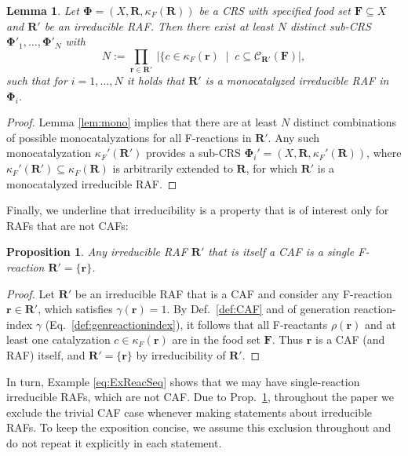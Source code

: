 \documentclass[pdflatex]{sn-jnl}
\theoremstyle{thmstyleone}%
\newtheorem{proposition}[theorem]{Proposition}%
\newtheorem{lemma}[theorem]{Lemma}%
\theoremstyle{examplesty}%
\theoremstyle{thmstylethree}%
\newcommand{\food}{\ensuremath{\mathbf{F}}}
\newcommand{\closure}[2]{\mathscr{C}_{#1}(#2)}
\newcommand{\FR}[0]{\mathbf{R}}
\newcommand{\fr}[0]{\mathbf{r}}
\newcommand{\RAF}[0]{\mathbf{R}'}
\newcommand{\cat}{\kappa_F}
\begin{document}
\vspace{6pt}
\begin{lemma}\label{lem:ExpoSubCRS}
  Let $\mathbf{\Phi}=(X,\FR,\cat(\FR))$ be a CRS with specified \emph{food
    set} $\food\subseteq X$ and $\RAF$ be an irreducible RAF. Then there
  exist at least $N$ distinct sub-CRS
  $\mathbf{\Phi}'_1,\ldots, \mathbf{\Phi}'_N$ with
  \begin{equation} \label{eq:ExpoNum} N := \prod_{\fr\in \RAF}\ \vert \{ c
    \in\cat(\fr) \; \mid\; c \subseteq \closure{\RAF}{\food} \vert,
  \end{equation}
  such that for $i=1,\ldots,N$ it holds that $\RAF$ is a monocatalyzed
  irreducible RAF in $\mathbf{\Phi}_i$.
\end{lemma} 
\begin{proof}
  Lemma \ref{lem:mono} implies that there are at least
  $N$ distinct combinations of
  possible monocatalyzations for all F-reactions in $\RAF$. Any such
  monocatalyzation $\cat'(\RAF)$ provides a sub-CRS
  $\mathbf{\Phi}_i'=(X,\FR,\cat'(\FR))$, where
  $\cat'(\RAF)\subseteq\cat(\FR)$ is arbitrarily extended to $\FR$, for
  which $\RAF$ is a monocatalyzed irreducible RAF.
\end{proof}

Finally, we underline that irreducibility is a property that is of interest
only for RAFs that are not CAFs: \vspace{6pt}
\begin{proposition}\label{prop:Caftrivial}
  Any irreducible RAF $\RAF$ that is itself a CAF is a single F-reaction
  $\RAF=\{\fr\}$.
\end{proposition}
\begin{proof}
  Let $\RAF$ be an irreducible RAF that is a CAF and consider any
  F-reaction $\fr\in \RAF$, which satisfies $\gamma(\fr)=1$. By
  Def.~\ref{def:CAF} and of generation reaction-index $\gamma$
  (Eq.~\eqref{def:genreactionindex}), it follows that all F-reactants
  $\rho(\fr)$ and at least one catalyzation $c\in \cat(\fr)$ are in the
  food set $\food$. Thus $\fr$ is a CAF (and RAF) itself, and
  $\RAF=\{\fr\}$ by irreducibility of $\RAF$.
\end{proof}

In turn, Example \eqref{eq:ExReacSeq} shows that we may have
single-reaction irreducible RAFs, which are not CAF. Due to
Prop.~\ref{prop:Caftrivial}, throughout the paper we exclude the trivial
CAF case whenever making statements about irreducible RAFs.  To keep the
exposition concise, we assume this exclusion throughout and do not repeat
it explicitly in each statement.
\end{document}
